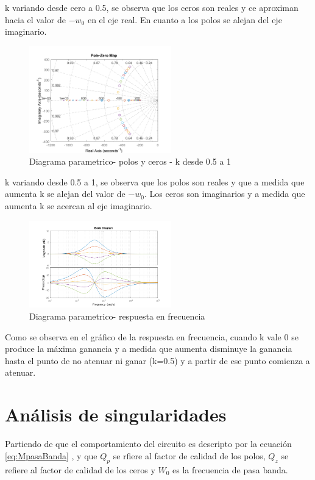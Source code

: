 \documentclass[../../tc_tp3_main.tex]{subfiles}
\begin{document}
k variando desde cero a 0.5, se observa que los ceros son reales y ce aproximan hacia el valor de $-w_0$ en el eje real. En cuanto a los polos se alejan del eje imaginario. 


\begin{figure}[H]
\centering
\includegraphics[width=0.55\textwidth]{imagenes/param051.png}
\caption{Diagrama parametrico- polos y ceros -  k desde 0.5 a 1} 
\end{figure}


k variando desde 0.5 a 1, se observa que los polos son reales y que a medida que aumenta k se alejan del valor de $-w_0$. Los ceros son imaginarios y a medida que aumenta k se acercan al eje imaginario.


\begin{figure}[H]
\centering
\includegraphics[width=0.55\textwidth]{imagenes/paramBode.png}
\caption{Diagrama parametrico- respuesta en frecuencia} 
\end{figure}

Como se observa en el gráfico de la respuesta en frecuencia, cuando k vale 0 se produce la máxima ganancia y a medida que aumenta disminuye la ganancia hasta el punto de no atenuar ni ganar (k=0.5) y a partir de ese punto comienza a atenuar.

\section{Análisis de singularidades}

Partiendo de que el comportamiento del circuito es descripto por la ecuación \ref{eq:MpasaBanda} , y que $Q_p$ se rfiere al factor de calidad de los polos, $Q_z$ se refiere al factor de calidad de los ceros y $W_0$ es la frecuencia de pasa banda.
\end{document}
